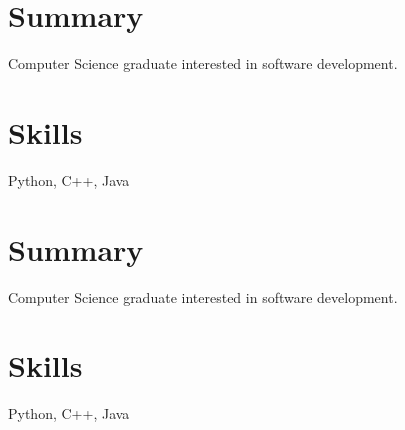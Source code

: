 \section{Summary}

Computer Science graduate interested in software development.

\section{Skills}

Python, C++, Java\section{Summary}

Computer Science graduate interested in software development.

\section{Skills}

Python, C++, Java
